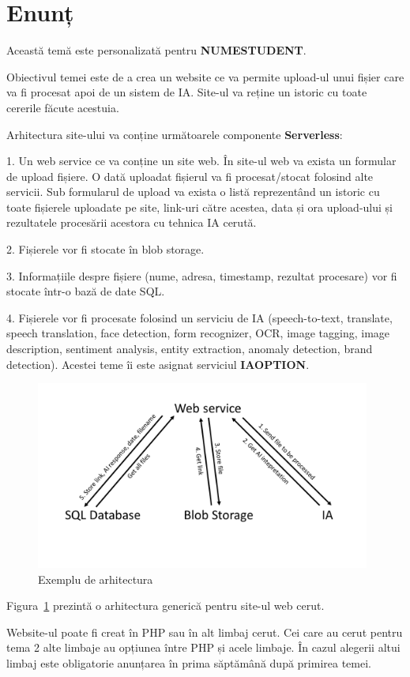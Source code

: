 \documentclass{article}
\newcounter{ProblemCounter} %
\newcommand{\ProblemName}{}
\newenvironment{Problem}[1][Sectiunea \arabic{ProblemCounter}]{ %
\stepcounter{ProblemCounter} %
\renewcommand{\ProblemName}{#1} %
\section{\ProblemName} %
}{}
\begin{document}
\begin{Problem}[Enunț]

Această temă este personalizată pentru \textbf{NUMESTUDENT}.

Obiectivul temei este de a crea un website ce va permite upload-ul unui fișier care va fi procesat apoi de un sistem de IA. Site-ul va reține un istoric cu toate cererile făcute acestuia.

Arhitectura site-ului va conține următoarele componente \textbf{Serverless}:

1. Un web service ce va conține un site web. În site-ul web va exista un formular de upload fișiere. O dată uploadat fișierul va fi procesat/stocat folosind alte servicii. Sub formularul de upload va exista o listă reprezentând un istoric cu toate fișierele uploadate pe site, link-uri către acestea, data și ora upload-ului și rezultatele procesării acestora cu tehnica IA cerută.

2. Fișierele vor fi stocate în blob storage.

3. Informațiile despre fișiere (nume, adresa, timestamp, rezultat procesare) vor fi stocate într-o bază de date SQL.

4. Fișierele vor fi procesate folosind un serviciu de IA (speech-to-text, translate, speech translation, face detection, form recognizer, OCR, image tagging, image description, sentiment analysis, entity extraction, anomaly detection, brand detection). Acestei teme îi este asignat serviciul \textbf{IAOPTION}.

\begin{figure}[th]
\centering
\includegraphics[width=11cm]{architecture.png}
  \caption{Exemplu de arhitectura}
  \label{fig:architecture_diagram}
\end{figure}

Figura~\ref{fig:architecture_diagram} prezintă o arhitectura generică pentru site-ul web cerut.

Website-ul poate fi creat în PHP sau în alt limbaj cerut. Cei care au cerut pentru tema 2 alte limbaje au opțiunea între PHP și acele limbaje. În cazul alegerii altui limbaj este obligatorie anunțarea în prima săptămână după primirea temei.


\end{Problem}
\end{document}
